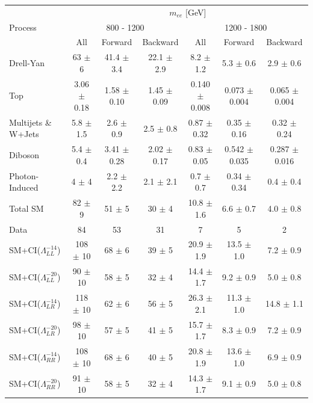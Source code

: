 	\begin {table}[h]
		\scriptsize 
		\begin{center}
		\begin{tabular}{  l | c c c | c c c  }	
			\hline
			\hline
			\multirow{3}{*}{Process} 	& \multicolumn{6}{c}{$m_{ee}$ [GeV]} \\
										& \multicolumn{3}{c}{800 - 1200} & \multicolumn{3}{c}{1200 - 1800} \\
										\cline{2-7}
										& All & Forward & Backward & All & Forward & Backward \\
			\hline
			Drell-Yan & 63 $\pm$ 6 & 41.4 $\pm$ 3.4 & 22.1 $\pm$ 2.9 & 8.2 $\pm$ 1.2 & 5.3 $\pm$ 0.6 & 2.9 $\pm$ 0.6 \\
			Top & 3.06 $\pm$ 0.18 & 1.58 $\pm$ 0.10 & 1.45 $\pm$ 0.09 & 0.140 $\pm$ 0.008 & 0.073 $\pm$ 0.004 & 0.065 $\pm$ 0.004 \\
			Multijets \& W+Jets & 5.8 $\pm$ 1.5 & 2.6 $\pm$ 0.9 & 2.5 $\pm$ 0.8 & 0.87 $\pm$ 0.32 & 0.35 $\pm$ 0.16 & 0.32 $\pm$ 0.24 \\
			Diboson & 5.4 $\pm$ 0.4 & 3.41 $\pm$ 0.28 & 2.02 $\pm$ 0.17 & 0.83 $\pm$ 0.05 & 0.542 $\pm$ 0.035 & 0.287 $\pm$ 0.016 \\
			Photon-Induced & 4 $\pm$ 4 & 2.2 $\pm$ 2.2 & 2.1 $\pm$ 2.1 & 0.7 $\pm$ 0.7 & 0.34 $\pm$ 0.34 & 0.4 $\pm$ 0.4 \\
			\hline
			Total SM & 82 $\pm$ 9 & 51 $\pm$ 5 & 30 $\pm$ 4 & 10.8 $\pm$ 1.6 & 6.6 $\pm$ 0.7 & 4.0 $\pm$ 0.8 \\
			\hline
			Data & 84 & 53 & 31 & 7 & 5 & 2 \\
			\hline
			SM+CI($\Lambda^{-14}_{LL}$) & 108 $\pm$ 10 & 68 $\pm$ 6 & 39 $\pm$ 5 & 20.9 $\pm$ 1.9 & 13.5 $\pm$ 1.0 & 7.2 $\pm$ 0.9 \\
			SM+CI($\Lambda^{-20}_{LL}$) & 90 $\pm$ 10 & 58 $\pm$ 5 & 32 $\pm$ 4 & 14.4 $\pm$ 1.7 & 9.2 $\pm$ 0.9 & 5.0 $\pm$ 0.8 \\
			SM+CI($\Lambda^{-14}_{LR}$) & 118 $\pm$ 10 & 62 $\pm$ 6 & 56 $\pm$ 5 & 26.3 $\pm$ 2.1 & 11.3 $\pm$ 1.0 & 14.8 $\pm$ 1.1 \\
			SM+CI($\Lambda^{-20}_{LR}$) & 98 $\pm$ 10 & 57 $\pm$ 5 & 41 $\pm$ 5 & 15.7 $\pm$ 1.7 & 8.3 $\pm$ 0.9 & 7.2 $\pm$ 0.9 \\
			SM+CI($\Lambda^{-14}_{RR}$) & 108 $\pm$ 10 & 68 $\pm$ 6 & 40 $\pm$ 5 & 20.8 $\pm$ 1.9 & 13.6 $\pm$ 1.0 & 6.9 $\pm$ 0.9 \\
			SM+CI($\Lambda^{-20}_{RR}$) & 91 $\pm$ 10 & 58 $\pm$ 5 & 32 $\pm$ 4 & 14.3 $\pm$ 1.7 & 9.1 $\pm$ 0.9 & 5.0 $\pm$ 0.8 \\

\end{tabular}
\end{center}
\end{table}
